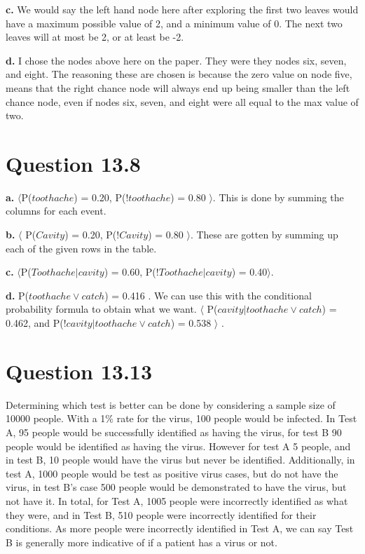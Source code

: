 \documentclass[12pt]{amsart}
\begin{document}
    \textbf{c.}  We would say the left hand node here after exploring the first two leaves would have a maximum possible value of 2, and a minimum value of 0. The next two leaves will at most be 2, or at least be -2. 
   \hfill \break
   
   \textbf{d.}  I chose the nodes above here on the paper. They were they nodes six, seven, and eight. The reasoning these are chosen is because the zero value on node five, means that the right chance node will always end up being smaller than the left chance node, even if nodes six, seven, and eight were all equal to the max value of two.

\section*{Question 13.8}


\textbf{a.} $\langle$P($toothache$) = 0.20, P($!toothache$) = 0.80  $\rangle$. This is done by summing the columns for each event.
  \hfill \break

\textbf{b.} $\langle$ P($Cavity$) = 0.20, P($!Cavity$) = 0.80 $\rangle$. These are gotten by summing up each of the given rows in the table.\hfill \break
  
\textbf{c.} $\langle $P($Toothache | cavity$) = 0.60, P($!Toothache | cavity$) = 0.40$ \rangle$. \hfill \break

\textbf{d.} P($toothache \vee catch$) = 0.416 . We can use this with the conditional probability formula to obtain what we want.  $ \langle$ P($cavity | toothache \vee catch$) = 0.462, and P($!cavity | toothache \vee catch$) = 0.538  $\rangle$ .
  \hfill \break

\section*{Question 13.13 }
	Determining which test is better can be done by considering a sample size of 10000 people. With a 1\% rate for the virus, 100 people would be infected. In Test A, 95 people would be successfully identified as having the virus, for test B 90 people would be identified as having the virus. However for test A 5 people, and in test B, 10 people would have the virus but never be identified. Additionally, in test A, 1000 people would be test as positive virus cases, but do not have the virus, in test B's case 500 people would be demonstrated to have the virus, but not have it. In total, for Test A, 1005 people were incorrectly identified as what they were, and in Test B, 510 people were incorrectly identified for their conditions. As more people were incorrectly identified in Test A, we can say Test B is generally more indicative of if a patient has a virus or not.
     
\end{document}

